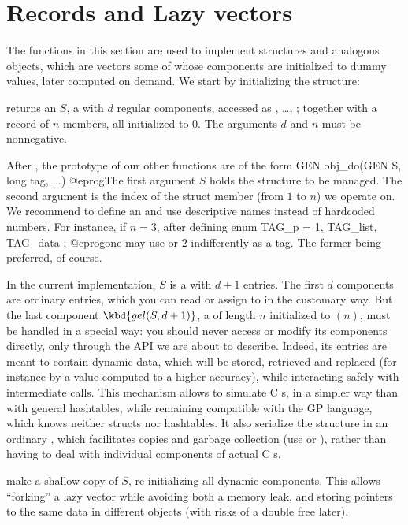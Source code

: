 \section{Records and Lazy vectors}
The functions in this section are used to implement  structures and
analogous objects, which are vectors some of whose components are initialized
to dummy values, later computed on demand. We start by initializing the
structure:

 returns an  $S$, a 
with $d$ regular components, accessed as , \dots,
; together with a record of $n$ members, all initialized to
$0$. The arguments $d$ and $n$ must be nonnegative.

After , the prototype of our other functions are of
the form
\bprog
  GEN obj_do(GEN S, long tag, ...)
@eprog\noindent The first argument $S$ holds the structure to be managed.
The second argument  is the index of the struct member (from $1$ to
$n$) we operate on. We recommend to define an  and use descriptive
names instead of hardcoded numbers. For instance, if $n = 3$, after defining
\bprog
  enum { TAG_p = 1, TAG_list, TAG_data };
@eprog\noindent one may use  or $2$ indifferently as a tag.
The former being preferred, of course.

In the current implementation, $S$ is a  with $d+1$ entries.
The first $d$ components are ordinary  entries, which you can
read or assign to in the customary way. But the last component $\kbd{gel(S,
d+1)}$, a  of length $n$ initialized to $(n)$, must
be handled in a special way: you should never access or modify its components
directly, only through the API we are about to describe. Indeed, its entries
are meant to contain dynamic data, which will be stored, retrieved and
replaced (for instance by a value computed to a higher accuracy), while
interacting safely with intermediate  calls. This mechanism
allows to simulate C s, in a simpler way than with general
hashtables, while remaining compatible with the GP language, which knows
neither structs nor hashtables. It also serialize the structure in an
ordinary , which facilitates copies and garbage collection (use
 or ), rather than having to deal with individual
components of actual C s.

 make a shallow copy of $S$, re-initializing
all dynamic components. This allows ``forking'' a lazy vector while
avoiding both a memory leak, and storing pointers to the same data
in different objects (with risks of a double free later).

